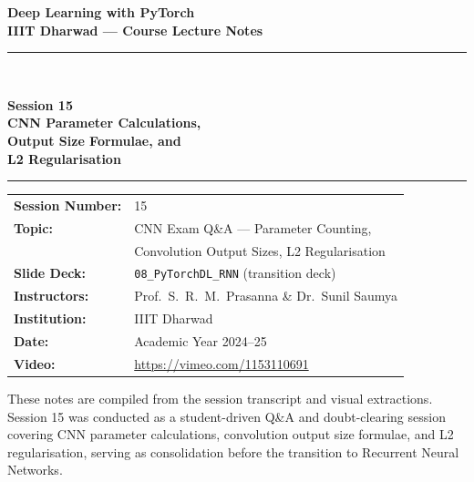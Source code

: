 \documentclass[12pt,a4paper]{article}
\begin{document}
\begin{titlepage}
  \centering
  \vspace*{2cm}
  {\LARGE\bfseries Deep Learning with PyTorch\\[0.4em]
   \large IIIT Dharwad --- Course Lecture Notes\par}
  \vspace{1.5cm}
  \rule{\linewidth}{0.5pt}\\[0.4em]
  {\huge\bfseries Session 15\\[0.3em]
   \Large CNN Parameter Calculations,\\
   Output Size Formulae, and\\
   L2 Regularisation\par}
  \rule{\linewidth}{0.5pt}
  \vspace{1.5cm}
  \begin{tabular}{ll}
    \textbf{Session Number:} & 15 \\[4pt]
    \textbf{Topic:}          & CNN Exam Q\&A --- Parameter Counting, \\
                             & Convolution Output Sizes, L2 Regularisation \\[4pt]
    \textbf{Slide Deck:}     & \texttt{08\_PyTorchDL\_RNN} (transition deck) \\[4pt]
    \textbf{Instructors:}    & Prof.\ S.~R.~M.\ Prasanna \&
                               Dr.\ Sunil Saumya \\[4pt]
    \textbf{Institution:}    & IIIT Dharwad \\[4pt]
    \textbf{Date:}           & Academic Year 2024--25 \\[4pt]
    \textbf{Video:}          & \url{https://vimeo.com/1153110691} \\
  \end{tabular}
  \vfill
  {\small These notes are compiled from the session transcript and visual
   extractions. Session 15 was conducted as a student-driven Q\&A and
   doubt-clearing session covering CNN parameter calculations, convolution
   output size formulae, and L2 regularisation, serving as consolidation
   before the transition to Recurrent Neural Networks.}
\end{titlepage}

\end{document}
